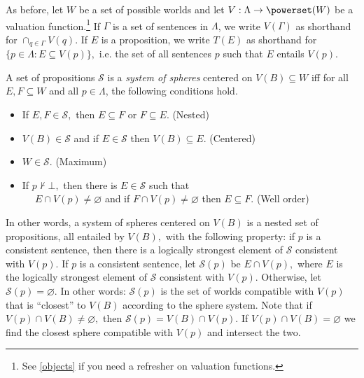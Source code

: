 As before, let $W$ be a set of possible worlds and let $V:\Lambda \rightarrow
\powerset(W)$ be a valuation function.\footnote{See \autoref{objects} if you
need a refresher on valuation functions.} If $\Gamma$ is a set of sentences in
$\Lambda$, we write $V(\Gamma)$ as shorthand for $\cap_{q\in \Gamma} V(q).$ If
$E$ is a proposition, we write $T(E)$ as shorthand for $\{ p \in \Lambda :
E\subseteq V(p) \},$ i.e. the set of all sentences $p$ such that $E$ entails
$V(p).$ 

A set of propositions $\mathcal{S}$ is a {\em system of spheres} centered on
$V(B)\subseteq W$ iff for all $E,F\subseteq W$ and all $p\in \Lambda$, the
following conditions hold.
\begin{itemize}
\item[] If $E,F\in \mathcal{S},$ then $E\subseteq F$ or $F\subseteq E$.
\hfill(Nested)
\item[] $V(B)\in \mathcal{S}$ and if $E\in\mathcal{S}$ then $V(B)\subseteq E$.
\hfill(Centered)
\item[] $W\in\mathcal{S}$. \hfill(Maximum)
\item[] If $p\nvdash \bot,$ then there is $E\in \mathcal{S}$ such that\\
  $\phantom{M}$\hspace{1em} $E\cap V(p)\neq \varnothing$ and if $F\cap V(p)\neq
  \varnothing$ then $E\subseteq F$. \hfill(Well order)
\end{itemize}
In other words, a system of spheres centered on $V(B)$ is a nested set of
propositions, all entailed by $V(B),$ with the following property: if $p$ is a
consistent sentence, then there is a logically strongest element of
$\mathcal{S}$ consistent with $V(p)$. If $p$ is a consistent sentence, let
$\mathcal{S}(p)$ be $E\cap V(p),$ where $E$ is the logically strongest element
of $\mathcal{S}$ consistent with $V(p)$. Otherwise, let $\mathcal{S}(p)=\varnothing$. In
other words: $\mathcal{S}(p)$ is the set of worlds compatible with $V(p)$ that
is ``closest'' to $V(B)$ according to the sphere system. Note that if $V(p) \cap
V(B)\neq \varnothing,$ then $\mathcal{S}(p)=V(B)\cap V(p).$ If $V(p)\cap V(B) =
\varnothing$ we find the closest sphere compatible with $V(p)$ and intersect the
two.

